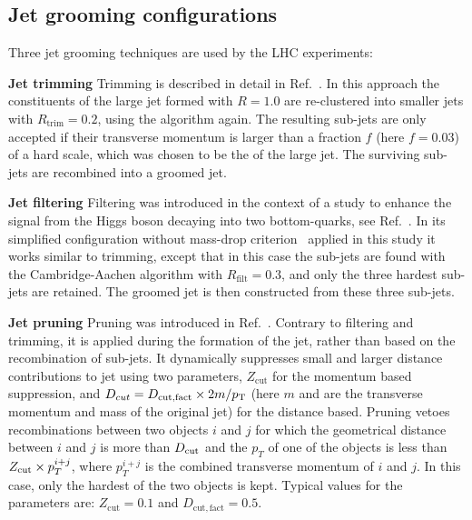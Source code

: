 
\subsection{Jet grooming configurations} \label{sec:grooming}

Three jet grooming techniques are used by the LHC experiments:
\begin{description}
\item{\textbf{Jet trimming}} Trimming is described in detail in Ref.~\cite{Krohn:2009th}. In this approach the constituents of the large \antikt{} jet formed with $R = 1.0$ are re-clustered into smaller jets with $R_{\mathrm{trim}} = 0.2$, using the \antikt{} algorithm again. The resulting sub-jets are only accepted if their transverse momentum is larger than a fraction $f$ (here $f = 0.03$) of a hard scale, which was chosen to be the \pT{} of the large jet. The surviving sub-jets are recombined into a groomed jet.
\item{\textbf{Jet filtering}} Filtering was introduced in the context
  of a study to enhance the signal from the Higgs boson decaying into
  two bottom-quarks, see Ref.~\cite{Butterworth:2008iy}. In its
  simplified configuration without mass-drop criterion~\cite{Cacciari:2008gd} 
  applied in this study it works
  similar to trimming, except that in this case the sub-jets are found
  with the Cambridge-Aachen algorithm
  \cite{Wobisch:1998wt,Wobisch:2000dk} with $R_{\mathrm{filt}} = 0.3$,
  and only the three hardest sub-jets are retained. The groomed jet is
  then constructed from these three sub-jets.   
\item{\textbf{Jet pruning}} Pruning was introduced in
  Ref.~\cite{Ellis:2009su}. Contrary to filtering and trimming, it
  is applied during the formation of the jet, rather than based on
  the recombination of sub-jets. It dynamically suppresses small
  and larger distance contributions to jet using two parameters,
  $Z_{\mathrm{cut}}$ for the momentum based suppression, and
  $D_{cut} = D_{\mathrm{cut,fact}} \times 2 m/p_{\mathrm{T}}$ (here $m$ and
  \pT{} are the transverse momentum and mass of the original jet)
  for the distance based. Pruning vetoes
  recombinations between two objects $i$ and $j$ for which the
  geometrical distance between $i$ and $j$ is more than $D_{\rm cut}$
  and the $p_T$ of one of the objects is less than $Z_{\rm cut}
  \times p_T^{i+j}$, where $p_T^{i+j}$ is the combined transverse
  momentum of $i$ and $j$. In this case, only the hardest of the two
  objects is kept. Typical values for the parameters are: 
  $Z_{\mathrm{cut}} = 0.1$ and
  $D_{\mathrm{cut,fact}} = 0.5$.
\end{description} 

